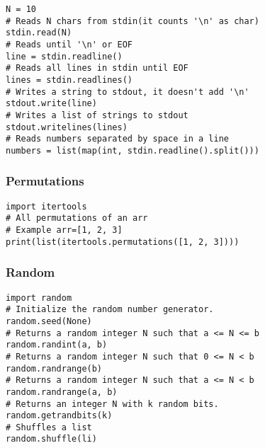 \documentclass[twoside]{article}
\begin{document}
\begin{multicols*}{2}
\begin{verbatim}
N = 10
# Reads N chars from stdin(it counts '\n' as char)
stdin.read(N)
# Reads until '\n' or EOF
line = stdin.readline()
# Reads all lines in stdin until EOF
lines = stdin.readlines()
# Writes a string to stdout, it doesn't add '\n'
stdout.write(line)
# Writes a list of strings to stdout
stdout.writelines(lines)
# Reads numbers separated by space in a line
numbers = list(map(int, stdin.readline().split()))
\end{verbatim}

{
\subsubsection*{Permutations}
}
\begin{verbatim}
import itertools
# All permutations of an arr
# Example arr=[1, 2, 3]
print(list(itertools.permutations([1, 2, 3])))
\end{verbatim}

{
\subsubsection*{Random}
}
\begin{verbatim}
import random
# Initialize the random number generator.
random.seed(None)
# Returns a random integer N such that a <= N <= b
random.randint(a, b)
# Returns a random integer N such that 0 <= N < b
random.randrange(b)
# Returns a random integer N such that a <= N < b
random.randrange(a, b)
# Returns an integer N with k random bits.
random.getrandbits(k)
# Shuffles a list
random.shuffle(li)
\end{verbatim}

{
}
\end{multicols*}
\end{document}
